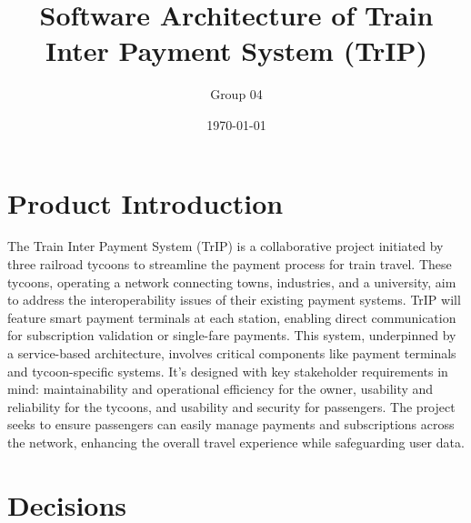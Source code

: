 \documentclass{article}
\title{Software Architecture of Train Inter Payment System (TrIP)}
\author{Group 04}
\date{\today}
\begin{document}
\maketitle
\newpage

\tableofcontents
\newpage

\section{Product Introduction}
The Train Inter Payment System (TrIP) is a collaborative project initiated by three railroad tycoons to streamline the payment process for train travel. These tycoons, operating a network connecting towns, industries, and a university, aim to address the interoperability issues of their existing payment systems. TrIP will feature smart payment terminals at each station, enabling direct communication for subscription validation or single-fare payments. This system, underpinned by a service-based architecture, involves critical components like payment terminals and tycoon-specific systems. It's designed with key stakeholder requirements in mind: maintainability and operational efficiency for the owner, usability and reliability for the tycoons, and usability and security for passengers. The project seeks to ensure passengers can easily manage payments and subscriptions across the network, enhancing the overall travel experience while safeguarding user data.
\newpage

\section{Decisions}

\newpage

\newpage

\newpage

\newpage

\newpage

\newpage

\newpage

\newpage


\appendix


% 
\end{document}
